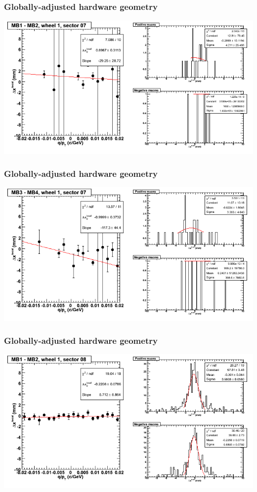 \documentclass[compress]{beamer}
\begin{document}
\begin{frame}
\frametitle{Globally-adjusted hardware geometry}
\includegraphics[width=\linewidth]{NOV4_segdiffs_HW/dt13_resid_D_07_12.png}
\end{frame}

\begin{frame}
\frametitle{Globally-adjusted hardware geometry}
\includegraphics[width=\linewidth]{NOV4_segdiffs_HW/dt13_resid_D_07_34.png}
\end{frame}

\begin{frame}
\frametitle{Globally-adjusted hardware geometry}
\includegraphics[width=\linewidth]{NOV4_segdiffs_HW/dt13_resid_D_08_12.png}
\end{frame}
\end{document}
